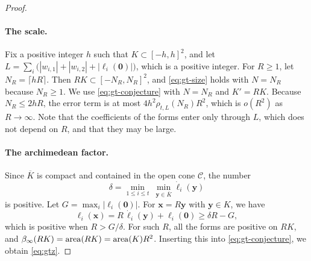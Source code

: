 \begin{proof}
\paragraph{The scale.} Fix a positive integer $h$ such that $K\subset[-h,h]^2$, and let $L=\sum_{i}\big(|w_{i,1}|+|w_{i,2}|+|\ell_i(\mathbf 0)|\big)$, which is a positive integer. For $R\ge1$, let $N_R=\lceil hR\rceil$. Then $RK\subset[-N_R,N_R]^2$, and \eqref{eq:gt-size} holds with $N=N_R$ because $N_R\ge1$. We use \eqref{eq:gt-conjecture} with $N=N_R$ and $K'=RK$. Because $N_R\le2hR$, the error term is at most $4h^2\rho_{t,L}(N_R)R^2$, which is $o(R^2)$ as $R\to\infty$. Note that the coefficients of the forms enter only through $L$, which does not depend on $R$, and that they may be large.

\paragraph{The archimedean factor.} Since $\overline K$ is compact and contained in the open cone $\mathcal C$, the number
\[
\delta=\min_{1\le i\le t}\ \min_{\mathbf y\in\overline K}\dot\ell_i(\mathbf y)
\]
is positive. Let $G=\max_i|\ell_i(\mathbf 0)|$. For $\mathbf x=R\mathbf y$ with $\mathbf y\in K$, we have
\begin{equation}\label{eq:gtz-positive}
\ell_i(\mathbf x)=R\,\dot\ell_i(\mathbf y)+\ell_i(\mathbf 0)\ge\delta R-G,
\end{equation}
which is positive when $R>G/\delta$. For such $R$, all the forms are positive on $RK$, and $\beta_\infty(RK)=\operatorname{area}(RK)=\operatorname{area}(K)R^2$. Inserting this into \eqref{eq:gt-conjecture}, we obtain \eqref{eq:gtz}.


\end{proof}
